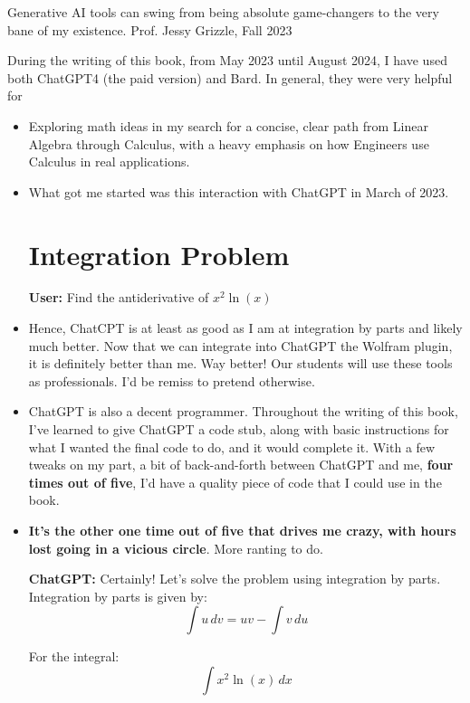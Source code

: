 
\begin{center}
\Large
    Generative AI tools can swing from being absolute game-changers to the very bane of my existence. 
    Prof. Jessy Grizzle, 
    Fall 2023
\end{center}

During the writing of this book, from May 2023 until August 2024, I have used both ChatGPT4 (the paid version) and Bard. In general, they were very helpful for
\begin{itemize}
    \item Exploring math ideas in my search for a concise, clear path from Linear Algebra through Calculus, with a heavy emphasis on how Engineers use Calculus in real applications.
    \item What got me started was this interaction with ChatGPT in March of 2023.
    \section*{Integration Problem}

\begin{shaded}
\textbf{User:} 
Find the antiderivative of \(x^2\ln(x)\)
\end{shaded}
\item Hence, ChatCPT is at least as good as I am at integration by parts and likely much better. Now that we can integrate into ChatGPT the Wolfram plugin, it is definitely better than me. Way better! Our students will use these tools as professionals. I'd be remiss to pretend otherwise.
\item ChatGPT is also a decent programmer. Throughout the writing of this book, I've learned to give ChatGPT a code stub, along with basic instructions for what I wanted the final code to do, and it would complete it. With a few tweaks on my part, a bit of back-and-forth between ChatGPT and me, \textbf{four times out of five}, I'd have a quality piece of code that I could use in the book.
\item \textbf{It's the other one time out of five that drives me crazy, with hours lost going in a vicious circle}. More ranting to do. 


\begin{shaded}
\textbf{ChatGPT:} 
Certainly! Let's solve the problem using integration by parts. \\

Integration by parts is given by:
\[
\int u \, dv = uv - \int v \, du
\]

For the integral:
\[
\int x^2 \ln(x) \, dx
\]


\end{shaded}
\end{itemize}
